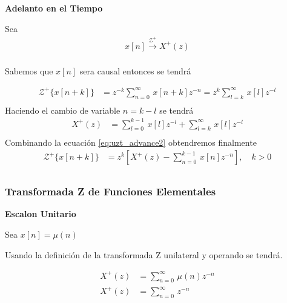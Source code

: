\documentclass[12pt]{article}
\begin{document}
\textbf{Adelanto en el Tiempo}
\vspace{5mm}

Sea 
\begin{equation}
    \begin{split}
        x[n]\xrightarrow{\mathscr{Z}^+}X^+(z)\\
    \end{split}
    \label{eq:uzt_advance}
\end{equation}

Sabemos que $x[n]$ sera causal entonces se tendrá

\begin{equation}
    \begin{split}
        \mathscr{Z}^+\{x[n+k]\}&=z^{-k}\displaystyle\sum_{n=0}^{\infty}\,x[n+k]z^{-n}=z^{k}\displaystyle\sum_{l=k}^{\infty}\,x[l]z^{-l}\\
    \end{split}
    \label{eq:uzt_advance1}
\end{equation}
Haciendo el cambio de variable $n=k-l$ se tendrá
\begin{equation}
    \begin{split}
        X^+(z)&=\displaystyle\sum_{l=0}^{k-1}\,x[l]z^{-l}+\displaystyle\sum_{l=k}^{\infty}\,x[l]z^{-l}\\
    \end{split}
    \label{eq:uzt_advance2}
\end{equation}
Combinando la ecuación \ref{eq:uzt_advance2} obtendremos finalmente
\begin{equation}
    \begin{split}
        \mathscr{Z}^+\{x[n+k]\}&=z^{k}[X^+(z)-\displaystyle\sum_{n=0}^{k-1}\,x[n]z^{-n}], \quad k>0\\
    \end{split}
    \label{eq:uzt_advance3}
\end{equation}
\subsubsection{Transformada Z de Funciones Elementales}

\textbf{Escalon Unitario}
\vspace{5mm}

Sea $x[n]=\mu(n)$

\vspace{5mm}
Usando la definición de la transformada Z unilateral y operando se tendrá.

\begin{equation}
    \begin{split}
        X^+(z)&=\displaystyle\sum_{n=0}^{\infty}\,\mu(n)z^{-n}\\
        X^+(z)&=\displaystyle\sum_{n=0}^{\infty}\,z^{-n}\\
    \end{split}
    \label{eq:ejer1}
\end{equation}
\end{document}
